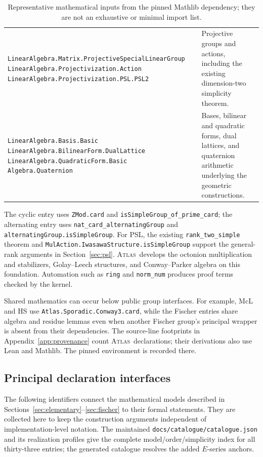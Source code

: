 \documentclass[11pt]{article}
\numberwithin{equation}{section}
\theoremstyle{definition}
\newcommand{\atlas}{\textsc{Atlas}}
\newcommand{\code}[1]{\texttt{\small #1}}
\newcommand{\leanname}[1]{{\small\nolinkurl{#1}}}
\begin{document}
\begin{table}[!htbp]
\begin{tabularx}{\textwidth}{@{}>{\raggedright\arraybackslash}p{} X@{}}
\addlinespace
\leanname{LinearAlgebra.Matrix.ProjectiveSpecialLinearGroup}\newline
\leanname{LinearAlgebra.Projectivization.Action}\newline
\leanname{LinearAlgebra.Projectivization.PSL.PSL2}
& Projective groups and actions, including the existing dimension-two simplicity theorem.\\
\addlinespace
\leanname{LinearAlgebra.Basis.Basic}\newline
\leanname{LinearAlgebra.BilinearForm.DualLattice}\newline
\leanname{LinearAlgebra.QuadraticForm.Basic}\newline
\leanname{Algebra.Quaternion}
& Bases, bilinear and quadratic forms, dual lattices, and quaternion arithmetic underlying the geometric constructions.\\
\bottomrule
\end{tabularx}
\caption{Representative mathematical inputs from the pinned Mathlib
dependency; they are
not an exhaustive or minimal import list.}
\label{tab:Mathlib}
\end{table}

The cyclic entry uses \leanname{ZMod.card} and
\leanname{isSimpleGroup_of_prime_card}; the alternating entry uses
\leanname{nat_card_alternatingGroup} and
\leanname{alternatingGroup.isSimpleGroup}.
For PSL, the existing \code{rank\_two\_simple} theorem and
\leanname{MulAction.IwasawaStructure.isSimpleGroup} support the
general-rank arguments in Section~\ref{sec:psl}.
\atlas\ develops the octonion multiplication and stabilizers,
Golay--Leech structures, and Conway--Parker algebra on this foundation.
Automation such as \code{ring} and \code{norm\_num} produces proof
terms checked by the kernel.

Shared mathematics can occur below public group interfaces. For example,
McL and HS use \leanname{Atlas.Sporadic.Conway3.card}, while the Fischer
entries share algebra and residue lemmas even when another Fischer
group's principal wrapper is absent from their dependencies.
The source-line footprints in Appendix~\ref{app:provenance} count
\atlas\ declarations; their derivations also use Lean and Mathlib.
The pinned environment is recorded there.

\subsection{Principal declaration interfaces}\label{app:interfaces}

The following identifiers connect the mathematical models described in
Sections~\ref{sec:elementary}--\ref{sec:fischer} to their formal
statements. They are collected here to keep the construction arguments
independent of implementation-level notation. The maintained
\leanname{docs/catalogue/catalogue.json} and its realization profiles give
the complete model/order/simplicity index for all thirty-three entries;
the generated catalogue resolves the added $E$-series anchors.
\end{document}
